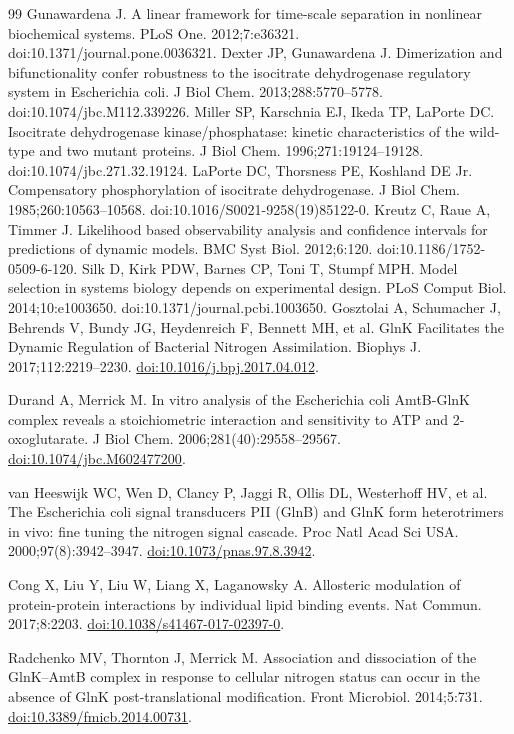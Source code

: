 \documentclass[11pt]{article}
\begin{document}
\begin{thebibliography}{99}
Gunawardena J. A linear framework for time-scale separation in nonlinear biochemical systems. PLoS One. 2012;7:e36321. doi:10.1371/journal.pone.0036321.
Dexter JP, Gunawardena J. Dimerization and bifunctionality confer robustness to the isocitrate dehydrogenase regulatory system in Escherichia coli. J Biol Chem. 2013;288:5770--5778. doi:10.1074/jbc.M112.339226.
Miller SP, Karschnia EJ, Ikeda TP, LaPorte DC. Isocitrate dehydrogenase kinase/phosphatase: kinetic characteristics of the wild-type and two mutant proteins. J Biol Chem. 1996;271:19124--19128. doi:10.1074/jbc.271.32.19124.
LaPorte DC, Thorsness PE, Koshland DE Jr. Compensatory phosphorylation of isocitrate dehydrogenase. J Biol Chem. 1985;260:10563--10568. doi:10.1016/S0021-9258(19)85122-0.
Kreutz C, Raue A, Timmer J. Likelihood based observability analysis and confidence intervals for predictions of dynamic models. BMC Syst Biol. 2012;6:120. doi:10.1186/1752-0509-6-120.
Silk D, Kirk PDW, Barnes CP, Toni T, Stumpf MPH. Model selection in systems biology depends on experimental design. PLoS Comput Biol. 2014;10:e1003650. doi:10.1371/journal.pcbi.1003650.
Gosztolai A, Schumacher J, Behrends V, Bundy JG, Heydenreich F, Bennett MH, et al. GlnK Facilitates the Dynamic Regulation of Bacterial Nitrogen Assimilation. Biophys J. 2017;112:2219--2230. \href{https://doi.org/10.1016/j.bpj.2017.04.012}{doi:10.1016/j.bpj.2017.04.012}.

Durand A, Merrick M. In vitro analysis of the Escherichia coli AmtB-GlnK complex reveals a stoichiometric interaction and sensitivity to ATP and 2-oxoglutarate. J Biol Chem. 2006;281(40):29558--29567. \href{https://doi.org/10.1074/jbc.M602477200}{doi:10.1074/jbc.M602477200}.

van Heeswijk WC, Wen D, Clancy P, Jaggi R, Ollis DL, Westerhoff HV, et al. The Escherichia coli signal transducers PII (GlnB) and GlnK form heterotrimers in vivo: fine tuning the nitrogen signal cascade. Proc Natl Acad Sci USA. 2000;97(8):3942--3947. \href{https://doi.org/10.1073/pnas.97.8.3942}{doi:10.1073/pnas.97.8.3942}.

Cong X, Liu Y, Liu W, Liang X, Laganowsky A. Allosteric modulation of protein-protein interactions by individual lipid binding events. Nat Commun. 2017;8:2203. \href{https://doi.org/10.1038/s41467-017-02397-0}{doi:10.1038/s41467-017-02397-0}.

Radchenko MV, Thornton J, Merrick M. Association and dissociation of the GlnK--AmtB complex in response to cellular nitrogen status can occur in the absence of GlnK post-translational modification. Front Microbiol. 2014;5:731. \href{https://doi.org/10.3389/fmicb.2014.00731}{doi:10.3389/fmicb.2014.00731}.

\end{thebibliography}
\end{document}
